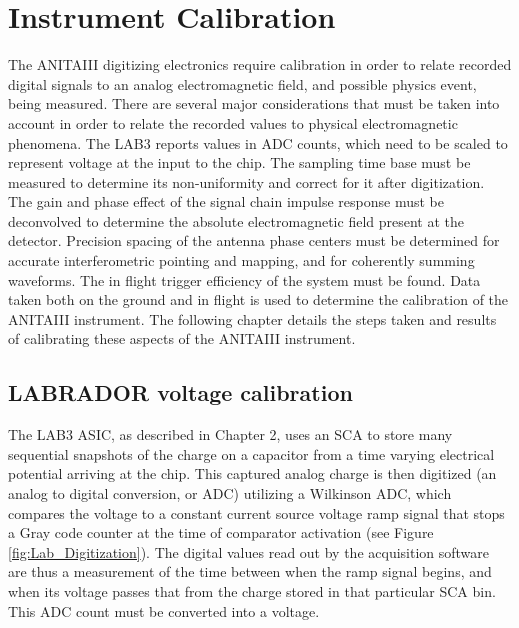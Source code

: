 	
\chapter{Instrument Calibration}

	The ANITAIII digitizing electronics require calibration in order to relate recorded digital signals to an analog electromagnetic field, and possible physics event, being measured.  There are several major considerations that must be taken into account in order to relate the recorded values to physical electromagnetic phenomena.  The LAB3 reports values in ADC counts, which need to be scaled to represent voltage at the input to the chip.  The sampling time base must be measured to determine its non-uniformity and correct for it after digitization.  The gain and phase effect of the signal chain impulse response must be deconvolved to determine the absolute electromagnetic field present at the detector.  Precision spacing of the antenna phase centers must be determined for accurate interferometric pointing and mapping, and for coherently summing waveforms. The in flight trigger efficiency of the system must be found. Data taken both on the ground and in flight is used to determine the calibration of the ANITAIII instrument. The following chapter details the steps taken and results of calibrating these aspects of the ANITAIII instrument.
	

	
\section{LABRADOR voltage calibration}
		The LAB3 ASIC, as described in Chapter 2, uses an SCA to store many sequential snapshots of the charge on a capacitor from a time varying electrical potential arriving at the chip.  This captured analog charge is then digitized (an analog to digital conversion, or ADC) utilizing a Wilkinson ADC, which compares the voltage to a constant current source voltage ramp signal that stops a Gray code counter at the time of comparator activation (see Figure \ref{fig:Lab_Digitization}).  The digital values read out by the acquisition software are thus a measurement of the time between when the ramp signal begins, and when its voltage passes that from the charge stored in that particular SCA bin.  This ADC count must be converted into a voltage.

